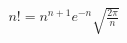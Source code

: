 \documentclass[preview]{standalone}
\begin{document}
\begin{align*}
n! = n^{n+1} e^{-n} \sqrt{\frac{2\pi}{n}}
\end{align*}
\end{document}
